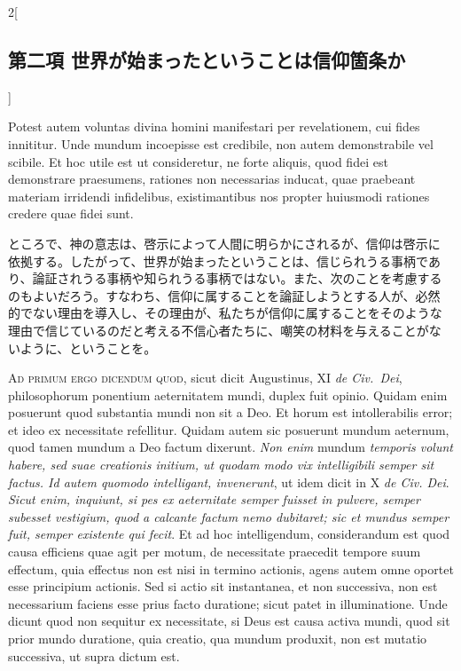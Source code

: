 \documentclass[paper=a4paper,fontsize=10pt,jafontsize=9pt,titlepage]{jlreq}
\begin{document}
\begin{paracol}{2}[\subsection{第二項 世界が始まったということは信仰箇条か}]
\switchcolumn*


Potest autem voluntas divina
 homini manifestari per revelationem, cui fides innititur. Unde mundum
 incoepisse est credibile, non autem demonstrabile vel scibile. Et hoc
 utile est ut consideretur, ne forte aliquis, quod fidei est demonstrare
 praesumens, rationes non necessarias inducat, quae praebeant materiam
 irridendi infidelibus, existimantibus nos propter huiusmodi rationes
 credere quae fidei sunt.


\switchcolumn


ところで、神の意志は、啓示によって人間に明らかにされるが、信仰は啓示に
依拠する。したがって、世界が始まったということは、信じられうる事柄であ
り、論証されうる事柄や知られうる事柄ではない。また、次のことを考慮する
のもよいだろう。すなわち、信仰に属することを論証しようとする人が、必然
的でない理由を導入し、その理由が、私たちが信仰に属することをそのような
理由で信じているのだと考える不信心者たちに、嘲笑の材料を与えることがな
いように、ということを。


\switchcolumn*[\subsection{ad.1}]


{\scshape Ad primum ergo dicendum quod}, sicut dicit Augustinus, XI {\itshape de
 Civ.~Dei}, philosophorum ponentium aeternitatem mundi, duplex fuit
 opinio. Quidam enim posuerunt quod substantia mundi non sit a Deo. Et
 horum est intollerabilis error; et ideo ex necessitate
 refellitur.
Quidam autem sic posuerunt mundum aeternum, quod tamen
 mundum a Deo factum dixerunt. {\itshape Non enim} mundum {\itshape temporis
 volunt habere, sed suae creationis initium, ut quodam modo vix
 intelligibili semper sit factus. Id autem quomodo intelligant,
 invenerunt}, ut idem dicit in X {\itshape de Civ. Dei}. {\itshape Sicut enim,
 inquiunt, si pes ex aeternitate semper fuisset in pulvere,
semper
 subesset vestigium, quod a calcante
factum nemo dubitaret; sic et
 mundus semper fuit, semper existente qui fecit}. Et ad hoc
 intelligendum, considerandum est quod causa efficiens quae agit per
 motum, de necessitate praecedit tempore suum effectum, quia effectus
 non est nisi in termino actionis, agens autem omne oportet esse
 principium actionis. Sed si actio sit instantanea, et non successiva,
 non est necessarium faciens esse prius facto duratione; sicut patet in
 illuminatione. Unde dicunt quod non sequitur ex necessitate, si Deus
 est causa activa mundi, quod sit prior mundo duratione, quia creatio,
 qua mundum produxit, non est mutatio successiva, ut supra dictum est.



\end{paracol}
\end{document}
